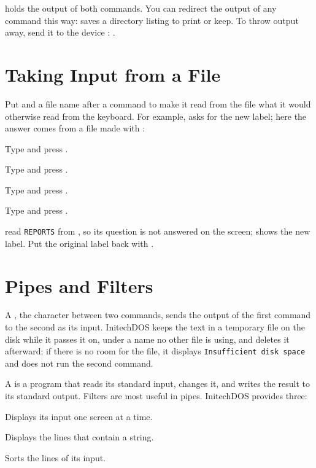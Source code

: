 
 holds the output of both commands.  You can redirect the
output of any command this way:  saves a directory
listing to print or keep.  To throw output away, send it to the device
: .

\section{Taking Input from a File}
Put \type{<} and a file name after a command to make it read from the file
what it would otherwise read from the keyboard.  For example, 
asks for the new label; here the answer comes from a file made with
:
\begin{Steps}
\item Type  and press .
\item Type  and press .
\item Type  and press .
\item Type  and press .
\end{Steps}


 read \texttt{REPORTS} from , so its question is
not answered on the screen;  shows the new label.  Put the original
label back with .

\section{Pipes and Filters}
A , the character \type{|} between two commands, sends the output
of the first command to the second as its input.  InitechDOS keeps the text
in a temporary file on the disk while it passes it on, under a name no other
file is using, and deletes it afterward; if there is no room for the file,
it displays \texttt{Insufficient disk space} and does not run the second
command.

A  is a program that reads its standard input, changes it, and
writes the result to its standard output.  Filters are most useful in
pipes.
InitechDOS provides three:

Displays its input one screen at a time.  

Displays the lines that contain a string.  

Sorts the lines of its input.  
